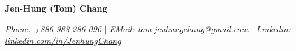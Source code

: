 \documentclass[letterpaper,11pt]{article}
\newcommand{\namespace}{
\vspace{3pt}
}
\newcommand{\sectionspace}{
\vspace{-20pt}
}
\begin{document}
\begin{center}
    \textbf{\Huge{\center Jen-Hung (Tom) Chang }} \\
    \namespace
    \href{tel:886983286096}{{\textit{Phone: +886 983-286-096}}} \qquad $|$ 
    \href{mailto:tom.jenhungchang@gmail.com}{{\textit{EMail: tom.jenhungchang@gmail.com}}} \qquad $|$ 
    \href{https://linkedin.com/in/JenhungChang}{{\textit{Linkedin: linkedin.com/in/JenhungChang}}}
    \vspace{-8pt}
\end{center}



    
\end{document}
